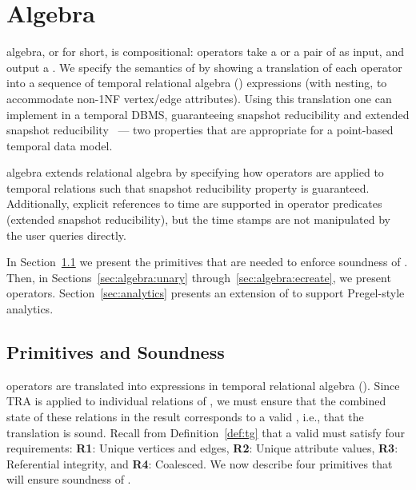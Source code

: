 \section{Algebra}
\label{sec:algebra}
\setlength{\textfloatsep}{5pt}%

\tg algebra, or \tga for short, is compositional: operators take a \tg
or a pair of \tgs as input, and output a \tg.  We specify the
semantics of \tga by showing a translation of each operator into a
sequence of temporal relational algebra (\tra) expressions (with
nesting, to accommodate non-1NF vertex/edge attributes).  Using this
translation one can implement \tga in a temporal DBMS, guaranteeing
snapshot reducibility and extended snapshot
reducibility~\cite{DBLP:reference/db/Bohlen092} --- two properties
that are appropriate for a point-based temporal data model.

\tra algebra extends relational algebra by specifying how operators
are applied to temporal relations such that snapshot reducibility
property is guaranteed.  Additionally, explicit references to time are
supported in operator predicates (extended snapshot reducibility), but
the time stamps are not manipulated by the user queries directly.



In Section~\ref{sec:algebra:integrity} we present the primitives that
are needed to enforce soundness of \tga.  Then, in
Sections~\ref{sec:algebra:unary} through~\ref{sec:algebra:ecreate}, we
present \tga operators.  Section~\ref{sec:analytics} presents an
extension of \tga to support Pregel-style analytics.  

\subsection{Primitives and Soundness}
\label{sec:algebra:integrity}

\tga operators are translated into expressions in temporal relational
algebra (\tra).  Since TRA is applied to individual relations of \tve,
we must ensure that the combined state of these relations in the
result corresponds to a valid \tg, i.e., that the translation is
sound.  Recall from Definition~\ref{def:tg} that a valid \tg must
satisfy four requirements: {\bf R1}: Unique vertices and edges, {\bf
  R2}: Unique attribute values, {\bf R3}: Referential integrity, and
{\bf R4}: Coalesced.  We now describe four primitives that will ensure
soundness of \tga.

